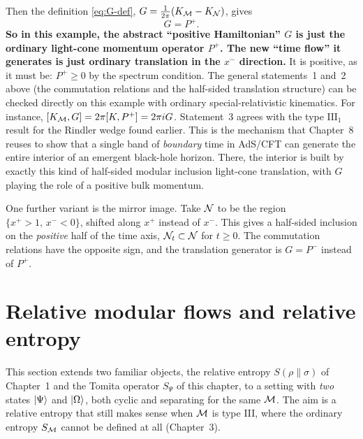Then the definition \eqref{eq:G-def}, $G=\tfrac1{2\pi}(K_{\mathcal{M}}-K_{\mathcal{N}})$, gives
\[
G = P^+ .
\]
\textbf{So in this example, the abstract ``positive Hamiltonian'' $G$ is just the ordinary light-cone momentum
operator $P^+$. The new ``time flow'' it generates is just ordinary translation in the $x^-$ direction.} It is
positive, as it must be: $P^+\ge0$ by the spectrum condition. The general statements~1 and~2 above (the
commutation relations and the half-sided translation structure) can be checked directly on this example with
ordinary special-relativistic kinematics. For instance, $[K_{\mathcal{M}},G]=2\pi[K,P^+]=2\pi iG$. Statement~3 agrees with
the type $\mathrm{III}_1$ result for the Rindler wedge found earlier. This is the mechanism that Chapter~8
reuses to show that a single band of \emph{boundary} time in AdS/CFT can generate the entire interior of an
emergent black-hole horizon. There, the interior is built by exactly this kind of half-sided modular inclusion
light-cone translation, with $G$ playing the role of a positive bulk momentum.

One further variant is the mirror image. Take $\mathcal{N}$ to be the region $\{x^+>1,\,x^-<0\}$, shifted along $x^+$
instead of $x^-$. This gives a half-sided inclusion on the \emph{positive} half of the time axis,
$\mathcal{N}_t\subset\mathcal{N}$ for $t\ge0$. The commutation relations have the opposite sign, and the translation generator is
$G=P^-$ instead of $P^+$.

\section{Relative modular flows and relative entropy}

This section extends two familiar objects, the relative entropy $S(\rho\|\sigma)$ of Chapter~1 and the
Tomita operator $S_\Psi$ of this chapter, to a setting with \emph{two} states $\ket\Psi$ and $\ket\Omega$,
both cyclic and separating for the same $\mathcal{M}$. The aim is a relative entropy that still makes sense when $\mathcal{M}$
is type III, where the ordinary entropy $S_{\mathcal{M}}$ cannot be defined at all (Chapter~3).


